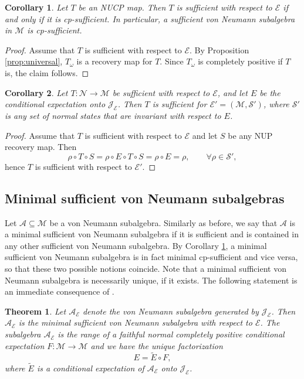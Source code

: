 \documentclass[12pt]{article}
\def\Ne{\mathcal N}
\def\Me{\mathcal M}
\def\Ee{\mathcal E}
\def\Je{\mathcal J}
\def\Ae{\mathcal A}
\def\Se{\mathcal S}
\newtheorem{theorem}{Theorem}
\newtheorem{coro}{Corollary}
\theoremstyle{definition}
\theoremstyle{remark}
\begin{document}
\begin{coro}\label{coro:cpsuf} Let $T$ be an NUCP map. Then $T$ is sufficient with
respect to $\Ee$ if and only if it is cp-sufficient. In particular, a sufficient von Neumann
subalgebra in $\Me$ is cp-sufficient. 

\end{coro}

\begin{proof} 
Assume that $T$ is sufficient with respect to $\Ee$. 
By Proposition  \ref{prop:universal}, $T_\omega$ is a recovery map for $T$. 
Since $T_\omega$ is completely positive if $T$ is, the claim follows. 

\end{proof}

\begin{coro}\label{coro:suff_ext} Let $T:\Ne\to \Me$  be  sufficient with respect to
$\Ee$, and let $E$ be the conditional expectation onto $\Je_\Ee$. Then $T$  is sufficient for $\Ee'=(\Me,\Se')$, where $\Se'$ is any set of
normal states that are invariant with respect to $E$.
\end{coro}

\begin{proof} Assume that $T$ is sufficient with respect to $\Ee$ and let $S$ be any NUP recovery map. Then 
\[
\rho\circ T\circ S=\rho\circ E\circ T\circ S=\rho\circ E=\rho,\qquad \forall \rho\in \Se',
\]
hence $T$ is sufficient with respect to $\Ee'$.

\end{proof}


\subsection{Minimal sufficient von Neumann subalgebras}


Let $\Ae\subseteq \Me$ be a von Neumann subalgebra. Similarly as before, we say that
$\Ae$ is a minimal sufficient von Neumann subalgebra if it is sufficient and is
contained in any other sufficient von Neumann subalgebra. By Corollary
\ref{coro:cpsuf}, a minimal sufficient von Neumann subalgebra is in fact minimal cp-sufficient and
vice versa, so that these two possible notions coincide.
Note that a minimal sufficient von Neumann subalgebra is necessarily unique, if it exists.
The following statement is an immediate consequence of \cite[Thm.~1]{luczak2014quantum}.


\begin{theorem}\label{thm:minsuf} 
Let $\Ae_\Ee$ denote  the von Neumann subalgebra generated by
$\Je_\Ee$. Then $\Ae_\Ee$ is the minimal sufficient von Neumann subalgebra with respect to $\Ee$.
The subalgebra $\Ae_\Ee$ is the range of a faithful normal completely positive conditional expectation
$F:\Me\to \Me$ and we have the unique factorization 
\[
E=\tilde E\circ F,
\]
where $\tilde E$ is a conditional expectation of $\Ae_\Ee$ onto $\Je_\Ee$. 
\end{theorem}
\end{document}
